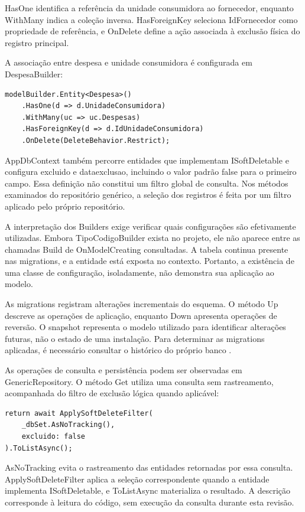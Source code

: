 HasOne identifica a referência da unidade consumidora ao fornecedor, enquanto WithMany indica a coleção inversa. HasForeignKey seleciona IdFornecedor como propriedade de referência, e OnDelete define a ação associada à exclusão física do registro principal.

A associação entre despesa e unidade consumidora é configurada em DespesaBuilder:

\begin{verbatim}
modelBuilder.Entity<Despesa>()
    .HasOne(d => d.UnidadeConsumidora)
    .WithMany(uc => uc.Despesas)
    .HasForeignKey(d => d.IdUnidadeConsumidora)
    .OnDelete(DeleteBehavior.Restrict);
\end{verbatim}

AppDbContext também percorre entidades que implementam ISoftDeletable e configura excluido e dataexclusao, incluindo o valor padrão false para o primeiro campo. Essa definição não constitui um filtro global de consulta. Nos métodos examinados do repositório genérico, a seleção dos registros é feita por um filtro aplicado pelo próprio repositório.

A interpretação dos Builders exige verificar quais configurações são efetivamente utilizadas. Embora TipoCodigoBuilder exista no projeto, ele não aparece entre as chamadas Build de OnModelCreating consultadas. A tabela continua presente nas migrations, e a entidade está exposta no contexto. Portanto, a existência de uma classe de configuração, isoladamente, não demonstra sua aplicação ao modelo.

As migrations registram alterações incrementais do esquema. O método Up descreve as operações de aplicação, enquanto Down apresenta operações de reversão. O snapshot representa o modelo utilizado para identificar alterações futuras, não o estado de uma instalação. Para determinar as migrations aplicadas, é necessário consultar o histórico do próprio banco \parencite{MicrosoftMigrations}.

As operações de consulta e persistência podem ser observadas em GenericRepository. O método Get utiliza uma consulta sem rastreamento, acompanhada do filtro de exclusão lógica quando aplicável:

\begin{verbatim}
return await ApplySoftDeleteFilter(
    _dbSet.AsNoTracking(),
    excluido: false
).ToListAsync();
\end{verbatim}

AsNoTracking evita o rastreamento das entidades retornadas por essa consulta. ApplySoftDeleteFilter aplica a seleção correspondente quando a entidade implementa ISoftDeletable, e ToListAsync materializa o resultado. A descrição corresponde à leitura do código, sem execução da consulta durante esta revisão.

